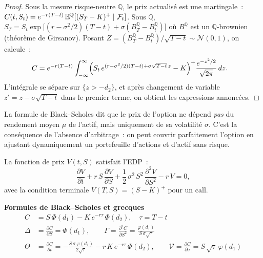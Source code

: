 \begin{proof}
Sous la mesure risque-neutre $\mathbb{Q}$, le prix actualis\'e est une
martingale~: $C(t, S_t) = e^{-r(T-t)}\,\mathbb{E}^{\mathbb{Q}}[(S_T - K)^+
\mid \mathcal{F}_t]$. Sous $\mathbb{Q}$, $S_T = S_t \exp\bigl[
(r - \sigma^2/2)(T-t) + \sigma(B_T^{\mathbb{Q}} - B_t^{\mathbb{Q}})\bigr]$
o\`u $B^{\mathbb{Q}}$ est un $\mathbb{Q}$-brownien (th\'eor\`eme de Girsanov).
Posant $Z = (B_T^{\mathbb{Q}} - B_t^{\mathbb{Q}})/\sqrt{T-t} \sim \mathcal{N}(0,1)$,
on calcule~:
\begin{align*}
  C &= e^{-r(T-t)} \int_{-\infty}^{\infty}
    \Bigl(S_t\,e^{(r-\sigma^2/2)(T-t) + \sigma\sqrt{T-t}\,z} - K\Bigr)^+
    \frac{e^{-z^2/2}}{\sqrt{2\pi}}\,dz.
\end{align*}
L'int\'egrale se s\'epare sur $\{z > -d_2\}$, et apr\`es changement de
variable $z' = z - \sigma\sqrt{T-t}$ dans le premier terme, on obtient
les expressions annonc\'ees.
\end{proof}

\begin{intuition}
La formule de Black--Scholes dit que le prix de l'option ne d\'epend
\emph{pas} du rendement moyen $\mu$ de l'actif, mais uniquement de sa
volatilit\'e $\sigma$. C'est la cons\'equence de l'absence d'arbitrage~:
on peut couvrir parfaitement l'option en ajustant dynamiquement un
portefeuille d'actions et d'actif sans risque.
\end{intuition}

\begin{definition}
La fonction de prix $V(t,S)$ satisfait l'EDP~:
\[
  \frac{\partial V}{\partial t} + r\,S\,\frac{\partial V}{\partial S}
  + \frac{1}{2}\,\sigma^2\,S^2\,\frac{\partial^2 V}{\partial S^2}
  - r\,V = 0,
\]
avec la condition terminale $V(T, S) = (S - K)^+$ pour un call.
\end{definition}

\begin{formules}
\textbf{Formules de Black--Scholes et grecques}
\begin{align*}
  C &= S\,\Phi(d_1) - K\,e^{-r\tau}\,\Phi(d_2),
    \quad \tau = T - t \\[4pt]
  \Delta &= \frac{\partial C}{\partial S} = \Phi(d_1), \qquad
  \Gamma = \frac{\partial^2 C}{\partial S^2}
    = \frac{\varphi(d_1)}{S\,\sigma\sqrt{\tau}} \\[4pt]
  \Theta &= \frac{\partial C}{\partial t}
    = -\frac{S\,\sigma\,\varphi(d_1)}{2\sqrt{\tau}}
    - r\,K\,e^{-r\tau}\,\Phi(d_2), \qquad
  \mathcal{V} = \frac{\partial C}{\partial \sigma}
    = S\,\sqrt{\tau}\,\varphi(d_1)
\end{align*}
\end{formules}

